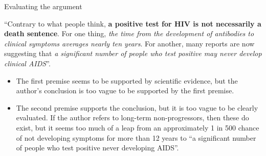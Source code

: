 \documentclass{beamer}
\begin{document}



\begin{frame}{Evaluating the argument}

	``Contrary to what people think, \textbf{a positive test for HIV is not necessarily a death sentence}. For one thing, \emph{the time from the development of antibodies to clinical symptoms averages nearly ten years}. For another, many reports are now suggesting that \emph{a significant number of people who test positive may never develop clinical AIDS}''.
	

\begin{itemize}
\item The first premise seems to be supported by scientific evidence, but the author's conclusion is too vague to be supported by the first premise.
\item The second premise supports the conclusion, but it is too vague to be clearly evaluated. If the author refers to long-term non-progressors, then these do exist, but it seems too much of a leap from an approximately 1 in 500 chance of not developing symptoms for more than 12 years to ``a significant number of people who test positive never developing AIDS''. 
\end{itemize}
\end{frame}
\end{document}
